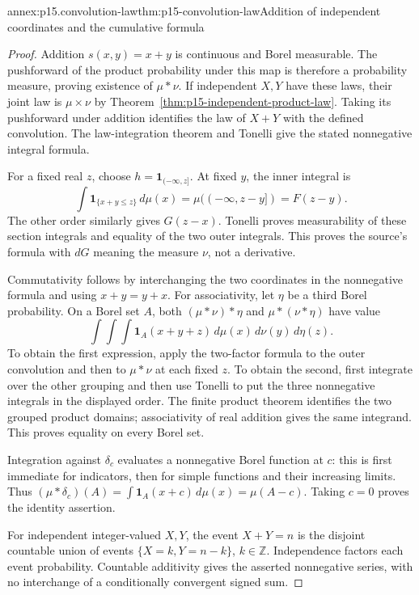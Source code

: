 \begin{annexitem}{annex:p15.convolution-law}{thm:p15-convolution-law}{Addition of independent coordinates and the cumulative formula}
\begin{proof}
Addition \(s(x,y)=x+y\) is continuous and Borel measurable.
The pushforward of the product probability under this map is
therefore a probability measure, proving existence of \(\mu*\nu\).
If independent \(X,Y\) have these laws, their joint law is
\(\mu\times\nu\) by Theorem~\ref{thm:p15-independent-product-law}.
Taking its pushforward under addition identifies the law of
\(X+Y\) with the defined convolution. The law-integration theorem
and Tonelli give the stated nonnegative integral formula.

For a fixed real \(z\), choose \(h=\mathbf1_{(-\infty,z]}\).
At fixed \(y\), the inner integral is
\[
 \int\mathbf1_{\{x+y\leq z\}}\,d\mu(x)
    =\mu((-\infty,z-y])=F(z-y).
\]
The other order similarly gives \(G(z-x)\). Tonelli proves
measurability of these section integrals and equality of the two
outer integrals. This proves the source's formula with \(dG\)
meaning the measure \(\nu\), not a derivative.

Commutativity follows by interchanging the two coordinates in the
nonnegative formula and using \(x+y=y+x\). For associativity,
let \(\eta\) be a third Borel probability. On a Borel set \(A\),
both \((\mu*\nu)*\eta\) and \(\mu*(\nu*\eta)\) have value
\[
 \int\!\int\!\int\mathbf1_A(x+y+z)
                   \,d\mu(x)\,d\nu(y)\,d\eta(z).
\]
To obtain the first expression, apply the two-factor formula to
the outer convolution and then to \(\mu*\nu\) at each fixed
\(z\). To obtain the second, first integrate over the other
grouping and then use Tonelli to put the three nonnegative integrals
in the displayed order. The finite product theorem identifies the
two grouped product domains; associativity of real addition gives
the same integrand. This proves equality on every Borel set.

Integration against \(\delta_c\) evaluates a nonnegative Borel
function at \(c\): this is first immediate for indicators, then
for simple functions and their increasing limits. Thus
\((\mu*\delta_c)(A)=\int\mathbf1_A(x+c)\,d\mu(x)=\mu(A-c)\).
Taking \(c=0\) proves the identity assertion.

For independent integer-valued \(X,Y\), the event \(X+Y=n\)
is the disjoint countable union of events \(\{X=k,Y=n-k\}\),
\(k\in\mathbb Z\). Independence factors each event probability.
Countable additivity gives the asserted nonnegative series, with
no interchange of a conditionally convergent signed sum.
\end{proof}
\end{annexitem}

